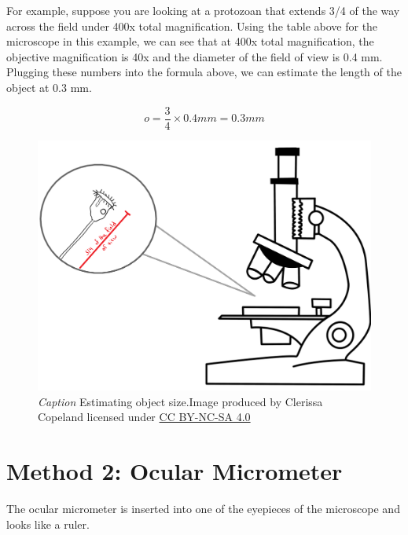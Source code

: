 \documentclass[
]{book}
\begin{document}
For example, suppose you are looking at a protozoan that extends 3/4 of the way across the field under 400x total magnification. Using the table above for the microscope in this example, we can see that at 400x total magnification, the objective magnification is 40x and the diameter of the field of view is 0.4 mm. Plugging these numbers into the formula above, we can estimate the length of the object at 0.3 mm.

\[o = \frac{3}{4} \times 0.4mm = 0.3mm\]

\begin{figure}
\centering
\includegraphics{images/DM_estimating-object-size.png}
\caption{\emph{Caption} Estimating object size.Image produced by Clerissa Copeland licensed under \href{https://creativecommons.org/licenses/by-nc-sa/4.0/}{CC BY-NC-SA 4.0}}
\end{figure}

\hypertarget{method-2-ocular-micrometer}{%
\section{Method 2: Ocular Micrometer}\label{method-2-ocular-micrometer}}

The ocular micrometer is inserted into one of the eyepieces of the microscope and looks like a ruler.
\end{document}
